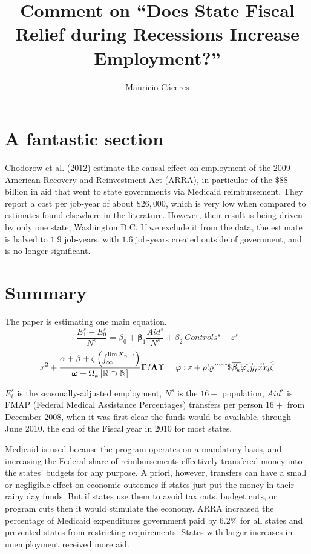 \documentclass{article}
\title{Comment on ``Does State Fiscal Relief during Recessions Increase Employment?''}
\author{Mauricio C\'aceres}
\begin{document}
\displayoptions

\section{A fantastic section}
\label{sec:a_fantastic_section}

Chodorow et al. (2012) estimate the causal effect on employment of the 2009 American Recovery and Reinvestment Act (ARRA), in particular of the $\$88$ billion in aid that went to state governments via Medicaid reimbursement. They report a cost per job-year of about $\$26,000$, which is very low when compared to estimates found elsewhere in the literature. However, their result is being driven by only one state, Washington D.C. If we exclude it from the data, the estimate is halved to $1.9$ job-years, with $1.6$ job-years created outside of government, and is no longer significant.

\section{Summary}
\label{sec:summary}

The paper is estimating one main equation.
\begin{equation}
  \dfrac{E_1^s - E_0^s}{N^s}
  = \beta_0 + \bm\beta_1 \dfrac{Aid^s}{N^s} + \beta_2 ~ Controls^s + \varepsilon^s
\end{equation}
\[
  x^2 + \dfrac{\alpha + \beta + \zeta \left(\int_{\infty}^{\lim X_n \to \empty}\right)}{\bm \omega + \Omega_k \left[\mathbb{R} \supset \mathbb{N}\right]}
  \bm\Gamma ? \bm\Lambda\Upsilon = \varphi : \varepsilon + \rho ! \varrho
\acute ~ \grave ~ \breve ~ \check ~ \mathring ~ \mathdollar
\overline{\beta_k} \widetilde{\varphi_z} \dot{y}_t \ddot{xx}_t \widehat{\zeta}
\]

$E_i^s$ is the seasonally-adjusted employment, $N^s$ is the $16+$ population, $Aid^s$ is FMAP (Federal Medical Assistance Percentages) transfers per person $16+$ from December 2008, when it was first clear the funds would be available, through June 2010, the end of the Fiscal year in 2010 for most states.

Medicaid is used because the program operates on a mandatory basis, and increasing the Federal share of reimbursements effectively transfered money into the states' budgets for any purpose. A priori, however, transfers can have a small or negligible effect on economic outcomes if states just put the money in their rainy day funds. But if states use them to avoid tax cuts, budget cuts, or program cuts then it would stimulate the economy. ARRA increased the percentage of Medicaid expenditures government paid by 6.2\% for all states and prevented states from restricting requirements. States with larger increases in unemployment received more aid.
\end{document}
